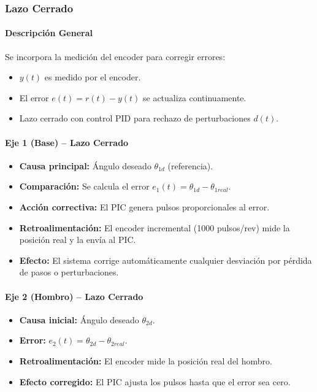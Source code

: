 \documentclass[11pt]{article}
\begin{document}
\subsubsection{Lazo Cerrado}

\paragraph{Descripción General}
Se incorpora la medición del encoder para corregir errores:
\begin{itemize}
	\item $y(t)$ es medido por el encoder.
	\item El error $e(t) = r(t) - y(t)$ se actualiza continuamente.
	\item Lazo cerrado con control PID para rechazo de perturbaciones $d(t)$.
\end{itemize}

\paragraph{Eje 1 (Base) – Lazo Cerrado}
\begin{itemize}
	\item \textbf{Causa principal:} Ángulo deseado $\theta_{1d}$ (referencia).
	\item \textbf{Comparación:} Se calcula el error $e_1(t) = \theta_{1d} - \theta_{1real}$.
	\item \textbf{Acción correctiva:} El PIC genera pulsos proporcionales al error.
	\item \textbf{Retroalimentación:} El encoder incremental (1000 pulsos/rev) mide la posición real y la envía al PIC.
	\item \textbf{Efecto:} El sistema corrige automáticamente cualquier desviación por pérdida de pasos o perturbaciones.
\end{itemize}

\paragraph{Eje 2 (Hombro) – Lazo Cerrado}
\begin{itemize}
	\item \textbf{Causa inicial:} Ángulo deseado $\theta_{2d}$.
	\item \textbf{Error:} $e_2(t) = \theta_{2d} - \theta_{2real}$.
	\item \textbf{Retroalimentación:} El encoder mide la posición real del hombro.
	\item \textbf{Efecto corregido:} El PIC ajusta los pulsos hasta que el error sea cero.
\end{itemize}
\end{document}
